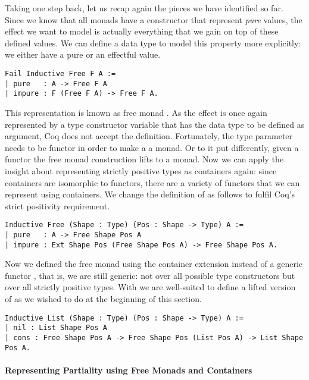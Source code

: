 Taking one step back, let us recap again the pieces we have identified
so far.
Since we know that all monads have a constructor that represent
\emph{pure} values, the effect we want to model is actually
everything that we gain on top of these defined values.
We can define a data type to model this property more explicitly: we
either have a pure or an effectful value.

\begin{verbatim}
Fail Inductive Free F A :=
| pure   : A -> Free F A
| impure : F (Free F A) -> Free F A.
\end{verbatim}

This representation is known as free monad \citep{swierstra2008data}.
As the effect is once again represented by a type constructor
variable  that has the data type to be defined as argument,
Coq does not accept the definition.
Fortunately, the type parameter  needs to be functor in order
to make a  a monad.
Or to it put differently, given a functor  the free monad
construction lifts  to a monad.
Now we can apply the insight about representing strictly positive
types as containers again: since containers are isomorphic to
functors, there are a variety of functors that we can represent using
containers.
We change the definition of  as follows to fulfil Coq's
strict positivity requirement.

\begin{verbatim}
Inductive Free (Shape : Type) (Pos : Shape -> Type) A :=
| pure   : A -> Free Shape Pos A
| impure : Ext Shape Pos (Free Shape Pos A) -> Free Shape Pos A.
\end{verbatim}

Now we defined the free monad using the container extension instead of
a generic functor , that is, we are still generic: not
over all possible type constructors but over all strictly positive
types.
With  we are well-suited to define a lifted version of
 as we wished to do at the beginning of this section.

\begin{verbatim}
Inductive List (Shape : Type) (Pos : Shape -> Type) A :=
| nil : List Shape Pos A
| cons : Free Shape Pos A -> Free Shape Pos (List Pos A) -> List Shape Pos A.
\end{verbatim}

\paragraph{Representing Partiality using Free Monads and Containers}

